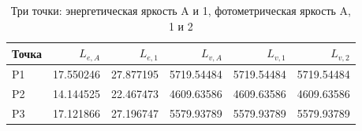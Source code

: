 \begin{table}[H]\centering\footnotesize
\caption{Три точки: энергетическая яркость A и 1, фотометрическая яркость A, 1 и 2}
\begin{tabular}{@{}lrrrrr@{}}\toprule Точка & $L_{e,A}$ & $L_{e,1}$ & $L_{v,A}$ & $L_{v,1}$ & $L_{v,2}$\\\midrule
P1 & 17.550246 & 27.877195 & 5719.54484 & 5719.54484 & 5719.54484 \\
P2 & 14.144525 & 22.467473 & 4609.63586 & 4609.63586 & 4609.63586 \\
P3 & 17.121866 & 27.196747 & 5579.93789 & 5579.93789 & 5579.93789 \\
\bottomrule\end{tabular}\end{table}